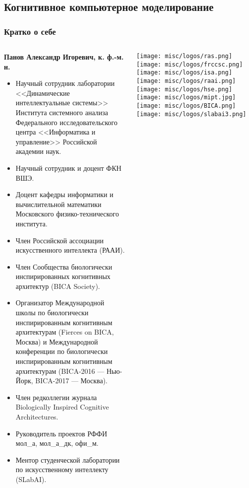 \documentclass[default]{beamer}
\begin{document}
	\subsection{Когнитивное компьютерное моделирование}
	\begin{frame}
		\frametitle{Кратко о себе}
		\scriptsize
		\begin{columns}
			\begin{column}{0.85\textwidth}
				\textbf{Панов Александр Игоревич, к. ф.-м. н.}
				\begin{itemize}
					\item Научный сотрудник лаборатории <<Динамические интеллектуальные системы>> Института системного анализа Федерального исследовательского центра <<Информатика и управление>> Российской академии наук.
					\item Научный сотрудник и доцент ФКН ВШЭ.
					\item Доцент кафедры информатики и вычислительной математики Московского физико-технического института.
					\item Член Российской ассоциации искусственного интеллекта (РААИ).
					\item Член Сообщества биологически инспирированных когнитивных архитектур (BICA Society).
					\item Организатор Международной	школы по биологически инспирированным когнитивным архитектурам (Fierces on BICA, Москва) и Международной конференции по биологически инспирированным когнитивным архитектурам (BICA-2016 --- Нью-Йорк, BICA-2017 --- Москва).
					\item Член редколлегии журнала Biologically Inspired Cognitive Architectures.					
					\item Руководитель проектов РФФИ мол\_а, мол\_а\_дк, офи\_м.
					\item Ментор студенческой лаборатории по искусственному интеллекту (SLabAI).
				\end{itemize}
			\end{column}
			
			\begin{column}{0.15\textwidth}
				\centering
				\texttt{[image: misc/logos/ras.png]}
				\vspace{7pt}
				\texttt{[image: misc/logos/frccsc.png]}
				\vspace{7pt}
				\texttt{[image: misc/logos/isa.png]}
				\vspace{7pt}
				\texttt{[image: misc/logos/raai.png]}
				\vspace{7pt}
				\texttt{[image: misc/logos/hse.png]}
				\vspace{7pt}
				\texttt{[image: misc/logos/mipt.jpg]}
				\vspace{5pt}
				\texttt{[image: misc/logos/BICA.png]}
				\vspace{5pt}
				\texttt{[image: misc/logos/slabai3.png]}
			\end{column}
			
		\end{columns}
	\end{frame}
	
\end{document}
